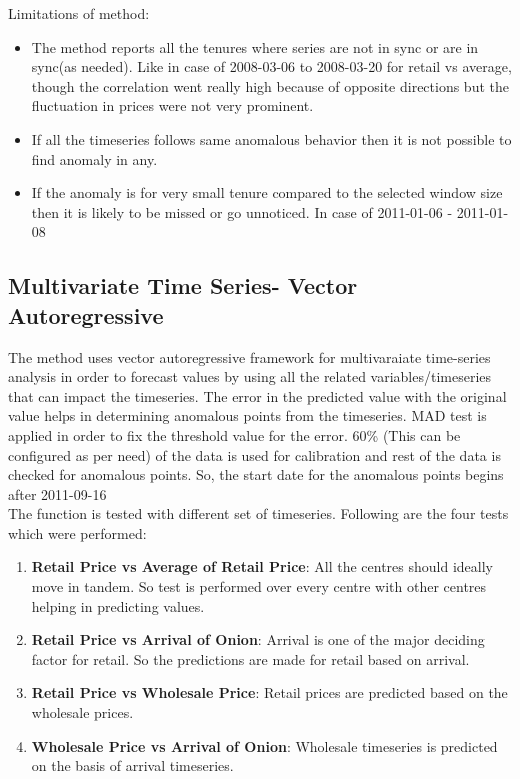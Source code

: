 		Limitations of method:
		\begin{itemize}
			\item The method reports all the tenures where series are not in sync or are in sync(as needed). Like in case of  2008-03-06 to 2008-03-20 for retail vs average, though the correlation went really high because of opposite directions but the fluctuation in prices were not very prominent.
			\item If all the timeseries follows same anomalous behavior then it is not possible to find anomaly in any.
			\item If the anomaly is for very small tenure compared to the selected window size then it is likely to be missed or go unnoticed. In case of 2011-01-06 - 2011-01-08
		\end{itemize}

\subsection{Multivariate Time Series- Vector Autoregressive}

		The method uses vector autoregressive framework for multivaraiate time-series analysis in order to forecast values by using all the related variables/timeseries that can impact the timeseries. The error in the predicted value with the original value helps in determining anomalous points from the timeseries. MAD test is applied in order to fix the threshold value for the error.
		60\% (This can be configured as per need) of the data is used for calibration and rest of the data is checked for anomalous points. So, the start date for the anomalous points begins after 2011-09-16
		\\
		The function is tested with different set of timeseries. Following are the four tests which were performed:
		\begin{enumerate}
		    \item \textbf{Retail Price vs Average of Retail Price}: All the centres should ideally move in tandem. So test is performed over every centre with other centres helping in predicting values.            
		    \item \textbf{Retail Price vs Arrival of Onion}: Arrival is one of the major deciding factor for retail. So the predictions are made for retail based on arrival.
		    \item \textbf{Retail Price vs Wholesale Price}: Retail prices are predicted based on the wholesale prices.
		    \item \textbf{Wholesale Price vs Arrival of Onion}: Wholesale timeseries is predicted on the basis of arrival timeseries.
		\end{enumerate}
		
